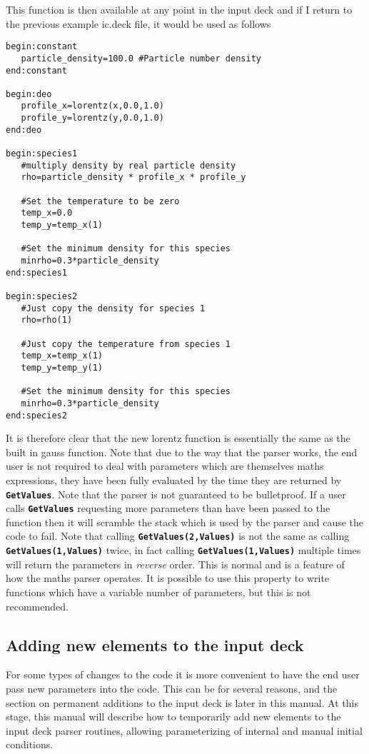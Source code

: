 \documentclass[12pt]{article}
\newcommand{\simpleboxverbatim}{\begin{Verbatim}[obeytabs=true,frame=single,
  framerule=0.5mm,rulecolor=\color{warwickmid}]}
\newcommand{\inlinecode}[1]{{\color{warwickred} \bf\texttt{#1}}}
\begin{document}
This function is then available at any point in the input deck and if I return
to the previous example ic.deck file, it would be used as follows

\simpleboxverbatim
begin:constant
   particle_density=100.0 #Particle number density
end:constant

begin:deo
   profile_x=lorentz(x,0.0,1.0)
   profile_y=lorentz(y,0.0,1.0)
end:deo

begin:species1
   #multiply density by real particle density
   rho=particle_density * profile_x * profile_y

   #Set the temperature to be zero
   temp_x=0.0
   temp_y=temp_x(1)

   #Set the minimum density for this species
   minrho=0.3*particle_density
end:species1

begin:species2
   #Just copy the density for species 1
   rho=rho(1)

   #Just copy the temperature from species 1
   temp_x=temp_x(1)
   temp_y=temp_y(1)

   #Set the minimum density for this species
   minrho=0.3*particle_density
end:species2
\end{Verbatim}

It is therefore clear that the new lorentz function is essentially the same as
the built in gauss function. Note that due to the way that the parser works,
the end user is not required to deal with parameters which are themselves
maths expressions, they have been fully evaluated by the time they are
returned by \inlinecode{GetValues}. Note that the parser is not guaranteed to
be bulletproof. If a user calls \inlinecode{GetValues} requesting more
parameters than have been passed to the function then it will scramble the
stack which is used by the parser and cause the code to fail. Note that
calling \inlinecode{GetValues(2,Values)} is not the same as calling
\inlinecode{GetValues(1,Values)} twice, in fact calling
\inlinecode{GetValues(1,Values)} multiple times will return the parameters in
{\it reverse} order. This is normal and is a feature of how the maths parser
operates. It is possible to use this property to write functions which have a
variable number of parameters, but this is not recommended.

\subsection{Adding new elements to the input deck}

For some types of changes to the code it is more convenient to have the end
user pass new parameters into the code. This can be for several reasons, and
the section on permanent additions to the input deck is later in this
manual. At this stage, this manual will describe how to temporarily add new
elements to the input deck parser routines, allowing parameterizing of
internal and manual initial conditions.
\end{document}
